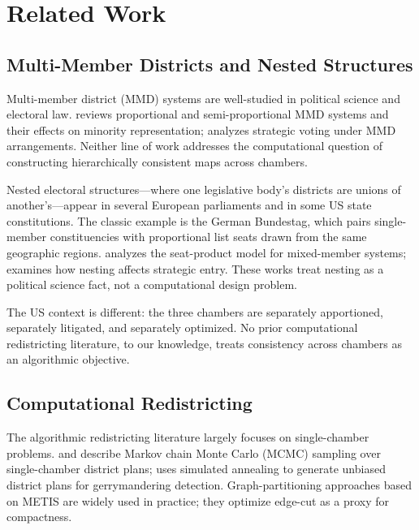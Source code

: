 \section{Related Work}
\label{sec:related}

\subsection{Multi-Member Districts and Nested Structures}

Multi-member district (MMD) systems are well-studied in political science and
electoral law.  \citet{grofman1993} reviews proportional and semi-proportional
MMD systems and their effects on minority representation; \citet{bowler1999}
analyzes strategic voting under MMD arrangements.  Neither line of work
addresses the computational question of constructing hierarchically consistent
maps across chambers.

Nested electoral structures---where one legislative body's districts are unions
of another's---appear in several European parliaments and in some US state
constitutions.  The classic example is the German Bundestag, which pairs
single-member constituencies with proportional list seats drawn from the same
geographic regions.  \citet{taagepera1989} analyzes the seat-product model for
mixed-member systems; \citet{cox2006} examines how nesting affects strategic
entry.  These works treat nesting as a political science fact, not a
computational design problem.

The US context is different: the three chambers are separately apportioned,
separately litigated, and separately optimized.  No prior computational
redistricting literature, to our knowledge, treats consistency across chambers
as an algorithmic objective.

\subsection{Computational Redistricting}

The algorithmic redistricting literature largely focuses on single-chamber
problems.  \citet{altman2011} and \citet{fifield2020} describe Markov chain
Monte Carlo (MCMC) sampling over single-chamber district plans; \citet{chen2013}
uses simulated annealing to generate unbiased district plans for gerrymandering
detection.  Graph-partitioning approaches based on METIS \citep{karypis1998}
are widely used in practice; they optimize edge-cut as a proxy for compactness.

